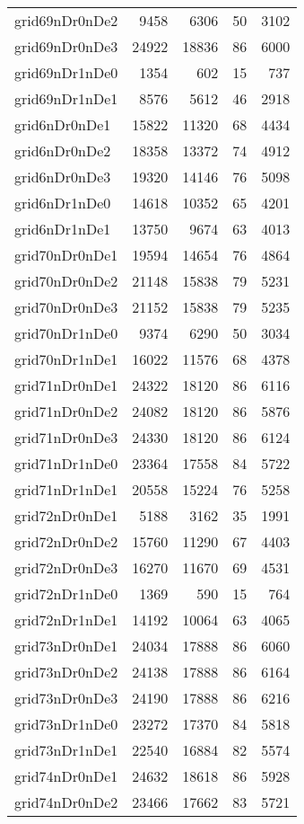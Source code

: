 \begin{longtable}{lrrrr}
grid69nDr0nDe2 & 9458 & 6306 & 50 & 3102 \\
grid69nDr0nDe3 & 24922 & 18836 & 86 & 6000 \\
grid69nDr1nDe0 & 1354 & 602 & 15 & 737 \\
grid69nDr1nDe1 & 8576 & 5612 & 46 & 2918 \\
grid6nDr0nDe1 & 15822 & 11320 & 68 & 4434 \\
grid6nDr0nDe2 & 18358 & 13372 & 74 & 4912 \\
grid6nDr0nDe3 & 19320 & 14146 & 76 & 5098 \\
grid6nDr1nDe0 & 14618 & 10352 & 65 & 4201 \\
grid6nDr1nDe1 & 13750 & 9674 & 63 & 4013 \\
grid70nDr0nDe1 & 19594 & 14654 & 76 & 4864 \\
grid70nDr0nDe2 & 21148 & 15838 & 79 & 5231 \\
grid70nDr0nDe3 & 21152 & 15838 & 79 & 5235 \\
grid70nDr1nDe0 & 9374 & 6290 & 50 & 3034 \\
grid70nDr1nDe1 & 16022 & 11576 & 68 & 4378 \\
grid71nDr0nDe1 & 24322 & 18120 & 86 & 6116 \\
grid71nDr0nDe2 & 24082 & 18120 & 86 & 5876 \\
grid71nDr0nDe3 & 24330 & 18120 & 86 & 6124 \\
grid71nDr1nDe0 & 23364 & 17558 & 84 & 5722 \\
grid71nDr1nDe1 & 20558 & 15224 & 76 & 5258 \\
grid72nDr0nDe1 & 5188 & 3162 & 35 & 1991 \\
grid72nDr0nDe2 & 15760 & 11290 & 67 & 4403 \\
grid72nDr0nDe3 & 16270 & 11670 & 69 & 4531 \\
grid72nDr1nDe0 & 1369 & 590 & 15 & 764 \\
grid72nDr1nDe1 & 14192 & 10064 & 63 & 4065 \\
grid73nDr0nDe1 & 24034 & 17888 & 86 & 6060 \\
grid73nDr0nDe2 & 24138 & 17888 & 86 & 6164 \\
grid73nDr0nDe3 & 24190 & 17888 & 86 & 6216 \\
grid73nDr1nDe0 & 23272 & 17370 & 84 & 5818 \\
grid73nDr1nDe1 & 22540 & 16884 & 82 & 5574 \\
grid74nDr0nDe1 & 24632 & 18618 & 86 & 5928 \\
grid74nDr0nDe2 & 23466 & 17662 & 83 & 5721 \\

\end{longtable}
